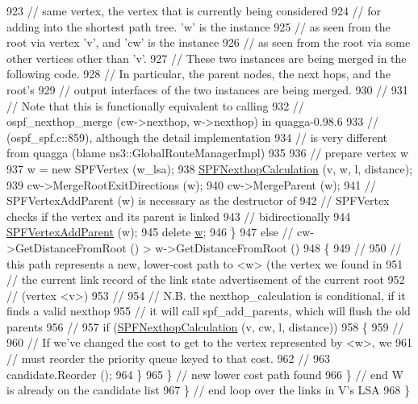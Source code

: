 \begin{DoxyCode}
923 \textcolor{comment}{// same vertex, the vertex that is currently being considered}
924 \textcolor{comment}{// for adding into the shortest path tree. 'w' is the instance}
925 \textcolor{comment}{// as seen from the root via vertex 'v', and 'cw' is the instance }
926 \textcolor{comment}{// as seen from the root via some other vertices other than 'v'.}
927 \textcolor{comment}{// These two instances are being merged in the following code.}
928 \textcolor{comment}{// In particular, the parent nodes, the next hops, and the root's}
929 \textcolor{comment}{// output interfaces of the two instances are being merged.}
930 \textcolor{comment}{// }
931 \textcolor{comment}{// Note that this is functionally equivalent to calling}
932 \textcolor{comment}{// ospf\_nexthop\_merge (cw->nexthop, w->nexthop) in quagga-0.98.6}
933 \textcolor{comment}{// (ospf\_spf.c::859), although the detail implementation}
934 \textcolor{comment}{// is very different from quagga (blame ns3::GlobalRouteManagerImpl)}
935 
936 \textcolor{comment}{// prepare vertex w}
937               w = \textcolor{keyword}{new} SPFVertex (w\_lsa);
938               \hyperlink{classns3_1_1GlobalRouteManagerImpl_ab082a78c423009f77c9cfe9018d40021}{SPFNexthopCalculation} (v, w, l, distance);
939               cw->MergeRootExitDirections (w);
940               cw->MergeParent (w);
941 \textcolor{comment}{// SPFVertexAddParent (w) is necessary as the destructor of }
942 \textcolor{comment}{// SPFVertex checks if the vertex and its parent is linked}
943 \textcolor{comment}{// bidirectionally}
944               \hyperlink{classns3_1_1GlobalRouteManagerImpl_ae7824a06e22187d1dc6823c46c95a3fc}{SPFVertexAddParent} (w);
945               \textcolor{keyword}{delete} \hyperlink{lte_2model_2fading-traces_2fading__trace__generator_8m_afd61ec66f9d7b807eece6eb12c781844}{w};
946             \}
947           \textcolor{keywordflow}{else} \textcolor{comment}{// cw->GetDistanceFromRoot () > w->GetDistanceFromRoot ()}
948             \{
949 \textcolor{comment}{// }
950 \textcolor{comment}{// this path represents a new, lower-cost path to <w> (the vertex we found in}
951 \textcolor{comment}{// the current link record of the link state advertisement of the current root}
952 \textcolor{comment}{// (vertex <v>)}
953 \textcolor{comment}{//}
954 \textcolor{comment}{// N.B. the nexthop\_calculation is conditional, if it finds a valid nexthop}
955 \textcolor{comment}{// it will call spf\_add\_parents, which will flush the old parents}
956 \textcolor{comment}{//}
957               \textcolor{keywordflow}{if} (\hyperlink{classns3_1_1GlobalRouteManagerImpl_ab082a78c423009f77c9cfe9018d40021}{SPFNexthopCalculation} (v, cw, l, distance))
958                 \{
959 \textcolor{comment}{//}
960 \textcolor{comment}{// If we've changed the cost to get to the vertex represented by <w>, we }
961 \textcolor{comment}{// must reorder the priority queue keyed to that cost.}
962 \textcolor{comment}{//}
963                   candidate.Reorder ();
964                 \}
965             \} \textcolor{comment}{// new lower cost path found}
966         \} \textcolor{comment}{// end W is already on the candidate list}
967     \} \textcolor{comment}{// end loop over the links in V's LSA}
968 \}
\end{DoxyCode}


